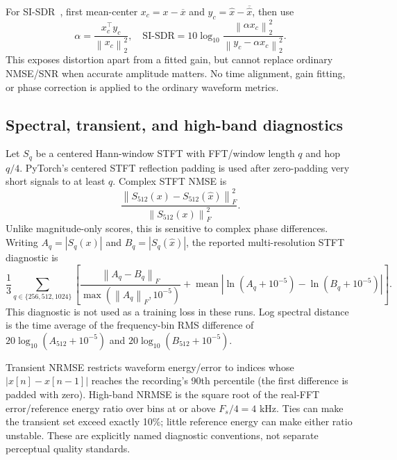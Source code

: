 \documentclass[11pt,a4paper]{article}
\newcommand{\norm}[1]{\left\lVert#1\right\rVert}
\begin{document}
For SI-SDR~\cite{leroux2019}, first mean-center $x_c=x-\overline x$ and $y_c=\widehat x-\overline{\widehat x}$, then use
\begin{equation}
 \alpha=\frac{x_c^\top y_c}{\norm{x_c}_2^2},\quad
 \mathrm{SI\mbox{-}SDR}=10\log_{10}\frac{\norm{\alpha x_c}_2^2}{\norm{y_c-\alpha x_c}_2^2}.
\end{equation}
This exposes distortion apart from a fitted gain, but cannot replace ordinary NMSE/SNR when accurate amplitude matters. No time alignment, gain fitting, or phase correction is applied to the ordinary waveform metrics.

\subsection{Spectral, transient, and high-band diagnostics}
Let $S_q$ be a centered Hann-window STFT with FFT/window length $q$ and hop $q/4$. PyTorch's centered STFT reflection padding is used after zero-padding very short signals to at least $q$. Complex STFT NMSE is
\begin{equation}
 \frac{\norm{S_{512}(x)-S_{512}(\widehat x)}_F^2}{\norm{S_{512}(x)}_F^2}.
\end{equation}
Unlike magnitude-only scores, this is sensitive to complex phase differences. Writing $A_q=|S_q(x)|$ and $B_q=|S_q(\widehat x)|$, the reported multi-resolution STFT diagnostic is
\begin{equation}
 \frac13\sum_{q\in\{256,512,1024\}}
 \left[\frac{\norm{A_q-B_q}_F}{\max(\norm{A_q}_F,10^{-5})}
 +\operatorname{mean}\left|\ln(A_q+10^{-5})-\ln(B_q+10^{-5})\right|\right].
\end{equation}
This diagnostic is not used as a training loss in these runs. Log spectral distance is the time average of the frequency-bin RMS difference of $20\log_{10}(A_{512}+10^{-5})$ and $20\log_{10}(B_{512}+10^{-5})$.

Transient NRMSE restricts waveform energy/error to indices whose $|x[n]-x[n-1]|$ reaches the recording's 90th percentile (the first difference is padded with zero). High-band NRMSE is the square root of the real-FFT error/reference energy ratio over bins at or above $F_s/4=4$ kHz. Ties can make the transient set exceed exactly 10\%; little reference energy can make either ratio unstable. These are explicitly named diagnostic conventions, not separate perceptual quality standards.
\end{document}
